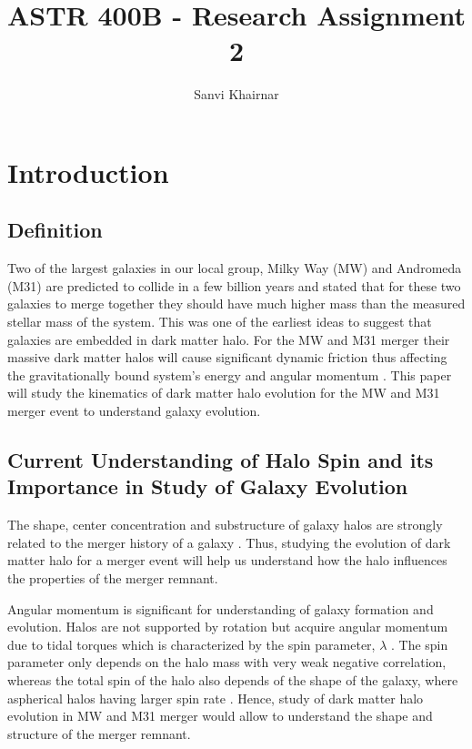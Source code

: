 \documentclass[twocolumn]{aastex631}
\begin{document}
\title{ASTR 400B - Research Assignment 2}


\author{Sanvi Khairnar}

 



\section{Introduction} \label{sec:intro}

\subsection{Definition} 
Two of the largest galaxies in our local group, Milky Way (MW) and Andromeda (M31) are predicted to collide in a few billion years and \citet{Kahn1959} stated that for these two galaxies to merge together they should have much higher mass than the measured stellar mass of the system. This was one of the earliest ideas to suggest that galaxies are embedded in dark matter halo. For the MW and M31 merger their massive dark matter halos will cause significant dynamic friction thus affecting the gravitationally bound system's energy and angular momentum \citep{Cox2008}. This paper will study the kinematics of dark matter halo evolution for the MW and M31 merger event to understand galaxy evolution.

\subsection{Current Understanding of Halo Spin and its Importance in Study of Galaxy Evolution}
The shape, center concentration and substructure of galaxy halos are strongly related to the merger history of a galaxy \citep{Drakos2019a}. Thus, studying the evolution of dark matter halo for a merger event will help us understand how the halo influences the properties of the merger remnant. 

Angular momentum is significant for understanding of galaxy formation and evolution. Halos are not supported by rotation but acquire angular momentum due to tidal torques which is characterized by the spin parameter, $\lambda$ \citep{Frenk2012}. The spin parameter only depends on the halo mass with very weak negative correlation, whereas the total spin of the halo also depends of the shape of the galaxy, where aspherical halos having larger spin rate \citep{Frenk2012}. Hence, study of dark matter halo evolution in MW and M31 merger would allow to understand the shape and structure of the merger remnant.
\end{document}
